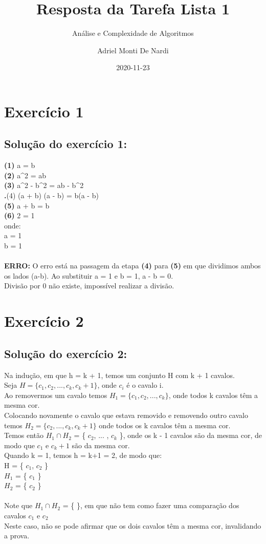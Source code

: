 \documentclass[a4paper,12pt]{scrartcl}
\title{Resposta da Tarefa Lista 1}
\subtitle{Análise e Complexidade de Algoritmos}
\author{Adriel Monti De Nardi}
\affil{PPComp --- Campus Serra, Ifes}
\date{2020-11-23}
\begin{document}
\maketitle

\section*{Exercício 1}
\subsection*{Solução do exercício 1:}
\textbf{(1)} a = b \\ 
\textbf{(2)} a^2 = ab \\ 
\textbf{(3) } a^2 - b^2 = ab - b^2 \\
\textbf.{(4)} (a + b) (a - b) = b(a - b)\\
\textbf{(5)} a + b = b \\
\textbf{(6)} 2 = 1  \\
onde: \\
a = 1 \\ 
b = 1 \\

\\\textbf{ERRO:} O erro está na passagem da etapa \textbf{(4)}  para \textbf{(5)} em que dividimos ambos os lados (a-b). Ao substituir a = 1 e b = 1, a - b = 0. \\Divisão por 0 não existe, impossível realizar a divisão.

\section*{Exercício 2}
\subsection*{Solução do exercício 2:}
Na indução, em que h = k + 1, temos  um conjunto H com k + 1 cavalos.\\
Seja $H = \{ c_1,c_2, ... ,c_k, c_k+1 \}$, onde $c_i$ é o cavalo i. \\
Ao removermos um cavalo temos $H_1= \{ c_1,c_2, ... ,c_k\}$, onde todos k cavalos têm a mesma cor.\\
Colocando novamente o cavalo que estava removido e removendo outro cavalo temos $H_2 = \{ c_2, ... ,c_k, c_k+1 \}$ onde todos os k cavalos têm a mesma cor.\\ Temos então 
$H_1 \cap H_2$ = \{ $c_2$, ... , $c_k$  \}, onde os k - 1 cavalos  são da mesma cor, de modo que $c_1$ e $c_k+1$ são da mesma cor. \\
Quando k = 1, temos h = k+1 = 2, de modo que:\\
H = \{ $c_1$, $c_2$ \} \\
$H_1$ = \{ $c_1$ \} \\
$H_2$ = \{ $c_2$ \} \\\\
Note que $H_1 \cap H_2$ = \{ \}, em que não tem como fazer uma comparação dos cavalos $c_1$ e $c_2$ \\
Neste caso, não se pode afirmar que os dois cavalos têm a mesma cor, invalidando a prova.
\end{document}

